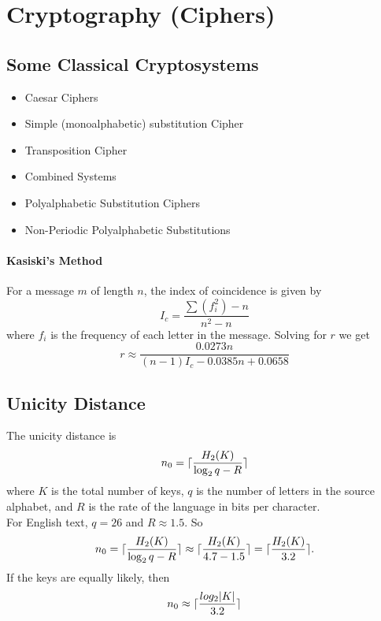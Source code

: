 \section{Cryptography (Ciphers)}
\subsection{Some Classical Cryptosystems}
\begin{itemize}
    \item Caesar Ciphers
    \item Simple (monoalphabetic) substitution Cipher
    \item Transposition Cipher
    \item Combined Systems
    \item Polyalphabetic Substitution Ciphers
    \item Non-Periodic Polyalphabetic Substitutions
\end{itemize}
\paragraph{Kasiski's Method} For a message \(m\) of length \(n\), the index of coincidence is given by
\[I_c = \frac{\sum (f_i^2) - n}{n^2 - n}\]
where \(f_i\) is the frequency of each letter in the message. Solving for \(r\) we get
\[r \approx \frac{0.0273n}{(n - 1)I_c - 0.0385n + 0.0658}\]

\subsection{Unicity Distance}
The unicity distance is
\[n_0 = \lceil {\frac{H_2(K)}{\log_2 q - R}} \rceil\]
where \(K\) is the total number of keys, \(q\) is the number of letters in the source alphabet, and \(R\) is the rate of the language in bits per character. \\

For English text, \(q = 26\) and \(R \approx 1.5\). So
\[n_0 = \lceil {\frac{H_2(K)}{\log_2 q - R}} \rceil \approx \lceil {\frac{H_2(K)}{4.7 - 1.5}} \rceil = \lceil {\frac{H_2(K)}{3.2}} \rceil.\]
If the keys are equally likely, then
\[n_0 \approx \lceil {\frac{log_2|K|}{3.2}} \rceil\]
